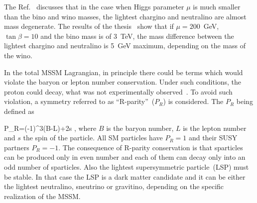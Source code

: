 


The Ref.~\cite{Gunion:1987yh} discusses that in the case when Higgs parameter $\mu$ is much smaller than the bino and wino masses, the lightest chargino and neutralino are almost mass degenerate. The results of the thesis~\cite{Duarte:2017fkm} show that if $\mu = 200$~GeV, $\tan \beta =10$ and the bino mass is of 3~TeV, the mass difference between the lightest chargino and neutralino is 5~GeV maximum, depending on the mass of the wino.

In the total MSSM Lagrangian, in principle there could be terms which would violate the baryon or lepton number conservation. Under such conditions, the proton could decay, what was not experimentally observed~\cite{Nishino:2009aa}. To avoid such violation, a symmetry referred to as ``R-parity''~($P_{R}$) is considered. The $P_{R}$ being defined as

{
P_R=(-1)^{3(B-L)+2s },
}
where $B$ is the baryon number, $L$ is the lepton number and $s$ the spin of the particle. All SM particles have $P_{R}=1$ and their SUSY partners $P_{R}=-1$. The consequence of R-parity conservation is that sparticles can be produced only in even number and each of them can decay only into an odd number of sparticles. Also the lightest supersymmetric particle~(LSP) must be stable. In that case the LSP is a dark matter candidate and it can be either the lightest neutralino, sneutrino or gravitino, depending on the specific realization of the MSSM. 

